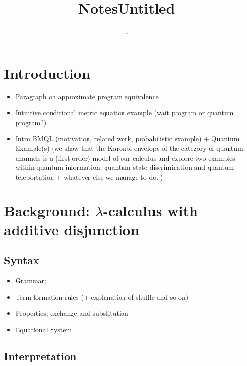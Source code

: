 \documentclass[10pt,a4paper]{amsart}
\author{\dots}
\title{Notes}
\theoremstyle{definition}
\theoremstyle{definition}
\theoremstyle{definition}
\theoremstyle{definition}
\theoremstyle{definition}
\theoremstyle{definition}
\begin{document}
\title{Untitled}

\begin{abstract}

\end{abstract}

\maketitle
\section{Introduction}

\begin{itemize}
  \item Paragraph on approximate program equivalence
  \item Intuitive conditional metric equation example (wait program or quantum program?) 
  \item  Intro BMQL (\ie motivation, related work, probabilistic example) + Quantum Example(s) (we show that the Karoubi envelope of the category of quantum channels is a (first-order) model of our calculus and explore two examples within quantum information: quantum state discrimination and quantum teleportation + whatever else we manage to do. )

\end{itemize}


\section{Background: $\lambda$-calculus with additive disjunction}

\subsection{Syntax}

\begin{itemize}
  \item Grammar;
  \item Term formation rules (+ explanation of shuffle and so on)
  \item Properties; exchange and substitution
  \item Equational System
\end{itemize}

\subsection{Interpretation}
\end{document}

